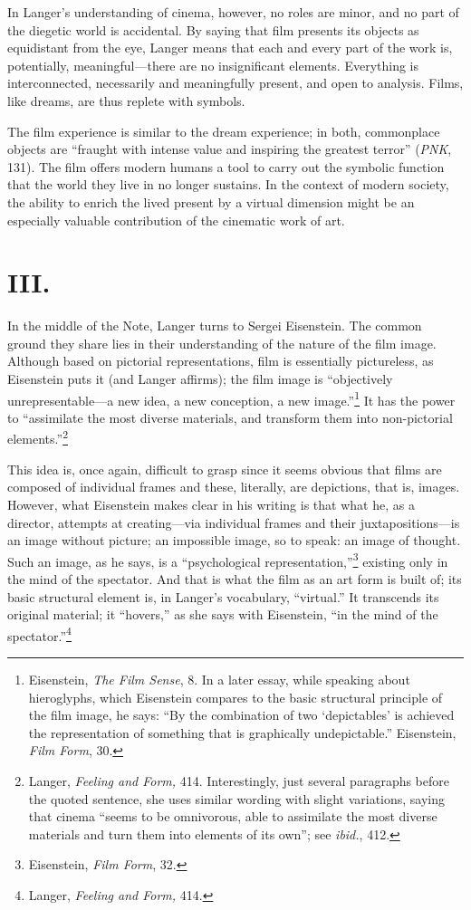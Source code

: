 \documentclass{tufte-handout}
\begin{document}
In Langer's understanding of cinema, however, no roles are minor, and no
part of the diegetic world is accidental. By saying that film presents
its objects as equidistant from the eye, Langer means that each and
every part of the work is, potentially, meaningful---there are no
insignificant elements. Everything is interconnected, necessarily and
meaningfully present, and open to analysis. Films, like dreams, are thus
replete with symbols.

The film experience is similar to the dream experience; in both,
commonplace objects are ``fraught with intense value and inspiring the
greatest terror'' (\emph{PNK}, 131). The film offers modern humans a
tool to carry out the symbolic function that the world they live in no
longer sustains. In the context of modern society, the ability to enrich
the lived present by a virtual dimension might be an especially valuable
contribution of the cinematic work of art.

\hypertarget{iii}{%
\section{III.}\label{iii}}

In the middle of the Note, Langer turns to Sergei Eisenstein. The common
ground they share lies in their understanding of the nature of the film
image. Although based on pictorial representations, film is essentially
pictureless, as Eisenstein puts it (and Langer affirms); the film image
is ``objectively unrepresentable---a new idea, a new conception, a new
image.''\footnote{Eisenstein, \emph{The Film Sense}, 8. In a later
  essay, while speaking about hieroglyphs, which Eisenstein compares to
  the basic structural principle of the film image, he says: ``By the
  combination of two `depictables' is achieved the representation of
  something that is graphically undepictable.'' Eisenstein, \emph{Film
  Form}, 30.} It has the power to ``assimilate the most diverse
materials, and transform them into non-pictorial elements.''\footnote{Langer,
  \emph{Feeling and Form,} 414. Interestingly, just several paragraphs
  before the quoted sentence, she uses similar wording with slight
  variations, saying that cinema ``seems to be omnivorous, able to
  assimilate the most diverse materials and turn them into elements of
  its own''; see \emph{ibid.}, 412.}

This idea is, once again, difficult to grasp since it seems obvious that
films are composed of individual frames and these, literally, are
depictions, that is, images. However, what Eisenstein makes clear in his
writing is that what he, as a director, attempts at creating---via
individual frames and their juxtapositions---is an image without
picture; an impossible image, so to speak: an image of thought. Such an
image, as he says, is a ``psychological representation,''\footnote{Eisenstein,
  \emph{Film Form}, 32.} existing only in the mind of the spectator. And
that is what the film as an art form is built of; its basic structural
element is, in Langer's vocabulary, ``virtual.'' It transcends its
original material; it ``hovers,'' as she says with Eisenstein, ``in the
mind of the spectator.''\footnote{Langer, \emph{Feeling and Form,} 414.}
\end{document}
